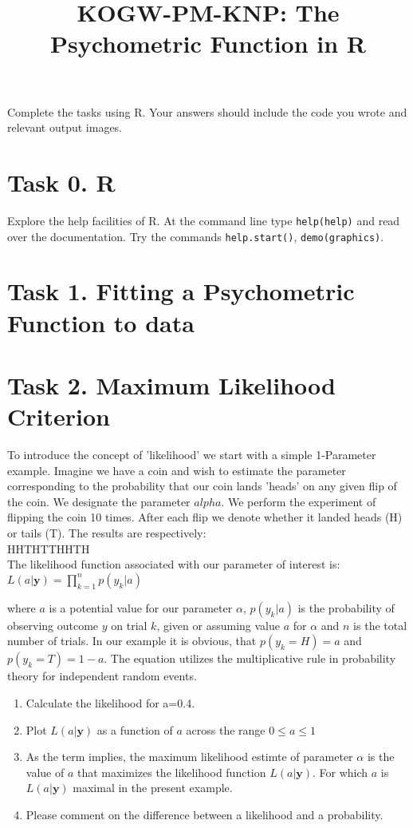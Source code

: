 \documentclass[12pt,english]{scrartcl}
\title{KOGW-PM-KNP: The Psychometric Function in R}
\begin{document}
\maketitle


Complete the tasks using R. Your answers should include the code you wrote and relevant output images.

\section*{Task 0. R}
Explore the help facilities of R. At the command line type \texttt{help(help)} and read over the documentation. Try the commands \texttt{help.start()}, \texttt{demo(graphics)}.

\section*{Task 1. Fitting a Psychometric Function to data}



\section*{Task 2. Maximum Likelihood Criterion}
To introduce the concept of 'likelihood' we start with a simple 1-Parameter example. 
Imagine we have a coin and wish to estimate the parameter corresponding to the probability that our coin lands 'heads' on any given flip of the coin. We designate the parameter $alpha$. We perform the experiment of flipping the coin 10 times. After each flip we denote whether it landed heads (H) or tails (T). The results are respectively: \\
HHTHTTHHTH\\

The likelihood function associated with our parameter of interest is:\\

$\displaystyle L(a|\textbf{y}) = \prod_{k=1}^n p(y_k|a)$

where $a$ is a potential value for our parameter $\alpha$, $p(y_k|a)$ is the probability of observing outcome $y$ on trial $k$, given or assuming value $a$ for $\alpha$ and $n$ is the total number of trials. In our example it is obvious, that $p(y_k=H) = a$ and $p(y_k=T)=1-a$. The equation utilizes the multiplicative rule in probability theory for independent random events. 

\begin{enumerate}
 \item Calculate the likelihood for a=0.4.
 \item Plot $L(a|\textbf{y})$ as a function of $a$ across the range $0\leq a \leq 1$
 \item As the term implies, the maximum likelihood estimte of parameter $\alpha$ is the value of $a$ that maximizes the likelihood function $L(a|\textbf{y})$. For which $a$ is $L(a|\textbf{y})$ maximal in the present example.
 \item Please comment on the difference between a likelihood and a probability.   
\end{enumerate}


  
\end{document}

